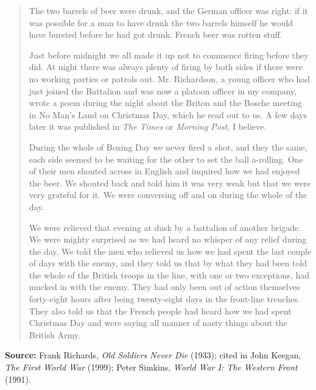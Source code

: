 \begin{quote}
The two barrels of beer were drunk, and the German officer was right: if it was possible for a man to have drunk the two barrels himself he would have bursted before he had got drunk. French beer was rotten stuff.

Just before midnight we all made it up not to commence firing before they did. At night there was always plenty of firing by both sides if there were no working parties or patrols out. Mr. Richardson, a young officer who had just joined the Battalion and was now a platoon officer in my company, wrote a poem during the night about the Briton and the Bosche meeting in No Man’s Land on Christmas Day, which he read out to us. A few days later it was published in \textit{The Times} or \textit{Morning Post}, I believe.

During the whole of Boxing Day we never fired a shot, and they the same, each side seemed to be waiting for the other to set the ball a-rolling. One of their men shouted across in English and inquired how we had enjoyed the beer. We shouted back and told him it was very weak but that we were very grateful for it. We were conversing off and on during the whole of the day.

We were relieved that evening at dusk by a battalion of another brigade. We were mighty surprised as we had heard no whisper of any relief during the day. We told the men who relieved us how we had spent the last couple of days with the enemy, and they told us that by what they had been told the whole of the British troops in the line, with one or two exceptions, had mucked in with the enemy. They had only been out of action themselves forty-eight hours after being twenty-eight days in the front-line trenches. They also told us that the French people had heard how we had spent Christmas Day and were saying all manner of nasty things about the British Army.
\end{quote}

\vspace{0.5em}

\noindent\textbf{Source:} Frank Richards, \textit{Old Soldiers Never Die} (1933); cited in John Keegan, \textit{The First World War} (1999); Peter Simkins, \textit{World War I: The Western Front} (1991).

